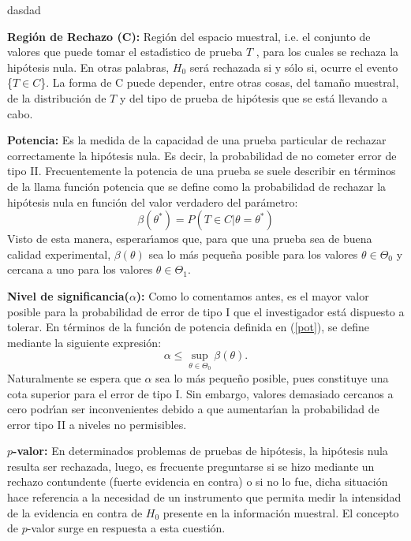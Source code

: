 \documentclass{article}
\theoremstyle{definition}
\begin{document}
dasdad

\textbf{Región de Rechazo (C): } Región del espacio muestral, i.e. el conjunto de valores que puede
tomar el estadı́stico de prueba $T$ , para los cuales se rechaza la hipótesis nula. En otras palabras,
$H_0$ será rechazada si y sólo si, ocurre el evento \{$T \in C$\}. La forma de C puede depender, entre
otras cosas, del tamaño muestral, de la distribución de $T$ y del tipo de prueba de hipótesis que se
está llevando a cabo.

\textbf{Potencia:} Es la medida de la capacidad de una prueba particular de rechazar correctamente la
hipótesis nula. Es decir, la probabilidad de no cometer error de tipo II. Frecuentemente la potencia de una prueba
se suele describir en términos de la llama función potencia que se define como la probabilidad de
rechazar la hipótesis nula en función del valor verdadero del parámetro:
\begin{equation}
	\beta(\theta^*)=P(T\in C|\theta=\theta^*)\label{pot}
\end{equation}
Visto de esta manera, esperarı́amos que, para que una prueba sea de buena calidad experimental,
$\beta(\theta)$ sea lo más pequeña posible para los valores $\theta\in\Theta_0$  y cercana a uno para los valores $\theta \in \Theta_1$.


\textbf{Nivel de significancia($\alpha$): }Como lo comentamos antes, es el mayor valor posible para la probabilidad de error de tipo I
que el investigador está dispuesto a tolerar. En términos de la función de potencia definida en (\ref{pot}),
se define mediante la siguiente expresión: 
\begin{equation}
	\alpha\leq\sup_{\theta\in\Theta_0} \beta(\theta).
\end{equation}
Naturalmente se espera que $\alpha$ sea lo más pequeño posible, pues constituye una cota superior para
el error de tipo I. Sin embargo, valores demasiado cercanos a cero podrı́an ser inconvenientes
debido a que aumentarı́an la probabilidad de error tipo II a niveles no permisibles.

\textbf{$p$-valor: } En determinados problemas de pruebas de hipótesis, la hipótesis nula resulta ser
rechazada, luego, es frecuente preguntarse si se hizo mediante un rechazo contundente (fuerte evidencia
en contra) o si no lo fue, dicha situación hace referencia a la necesidad de un instrumento que
permita medir la intensidad de la evidencia en contra de $H_0$ presente en la información muestral.
El concepto de $p$-valor surge en respuesta a esta cuestión.
\end{document}
